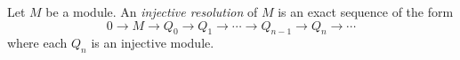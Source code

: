 \documentclass{article}
\begin{document}
Let $M$ be a module.  An {\it injective resolution} of $M$
is an exact sequence of the form
$$0 \to M \to Q_0 \to Q_1 \to \cdots \to Q_{n-1} \to Q_n \to \cdots$$
where each $Q_n$ is an injective module.
\end{document}
